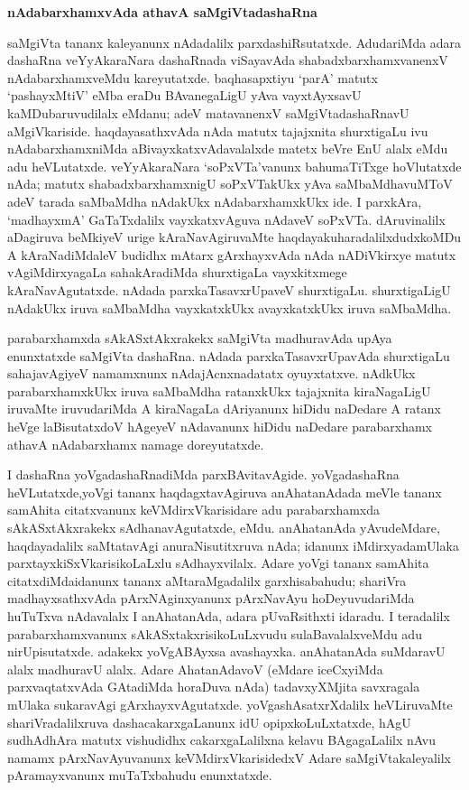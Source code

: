 \newpage

\begin{center}
{\Large\bf nAdabarxhamxvAda athavA saMgiVtadashaRna}
\end{center}

saMgiVta tananx kaleyanunx nAdadalilx parxdashiRsutatxde. AdudariMda adara dashaRna veYyAkaraNara dashaRnada viSayavAda shabadxbarxhamxvanenxV nAdabarxhamxveMdu kareyutatxde. baqhasapxtiyu `parA' matutx `pashayxMtiV' eMba eraDu BAvanegaLigU yAva vayxtAyxsavU kaMDubaruvudilalx eMdanu; adeV matavanenxV saMgiVtadashaRnavU aMgiVkariside. haqdayasathxvAda nAda matutx tajajxnita shurxtigaLu ivu nAdabarxhamxniMda aBivayxkatxvAdavalalxde matetx beVre EnU alalx eMdu adu heVLutatxde. veYyAkaraNara `soPxVTa'vanunx bahumaTiTxge hoVlutatxde nAda; matutx shabadxbarxhamxnigU soPxVTakUkx yAva saMbaMdhavuMToV adeV tarada saMbaMdha nAdakUkx nAdabarxhamxkUkx ide. I parxkAra, `madhayxmA' GaTaTxdalilx vayxkatxvAguva nAdaveV soPxVTa. dAruvinalilx aDagiruva beMkiyeV urige kAraNavAgiruvaMte haqdayakuharadalilxdudxkoMDu A kAraNadiMdaleV budidhx mAtarx gArxhayxvAda nAda nADiVkirxye matutx vAgiMdirxyagaLa sahakAradiMda shurxtigaLa vayxkitxmege kAraNavAgutatxde. nAdada parxkaTasavxrUpaveV shurxtigaLu. shurxtigaLigU nAdakUkx iruva saMbaMdha vayxkatxkUkx avayxkatxkUkx iruva saMbaMdha.

parabarxhamxda sAkASxtAkxrakekx saMgiVta madhuravAda upAya enunxtatxde saMgiVta dashaRna. nAdada parxkaTasavxrUpavAda shurxtigaLu sahajavAgiyeV namamxnunx nAdajAcnxnadatatx oyuyxtatxve. nAdkUkx parabarxhamxkUkx iruva saMbaMdha ratanxkUkx tajajxnita kiraNagaLigU iruvaMte iruvudariMda A kiraNagaLa dAriyanunx hiDidu naDedare A ratanx heVge laBisutatxdoV hAgeyeV nAdavanunx hiDidu naDedare parabarxhamx athavA nAdabarxhamx namage doreyutatxde.

I dashaRna yoVgadashaRnadiMda parxBAvitavAgide. yoVgadashaRna heVLutatxde,\break yoVgi tananx haqdagxtavAgiruva anAhatanAdada meVle tananx samAhita citatxvanunx keVMdirxV\-karisidare adu parabarxhamxda sAkASxtAkxrakekx sAdhanavAgutatxde, eMdu. anAhatanAda yAvu\break\-deMdare, haqdayadalilx saMtatavAgi anuraNisutitxruva nAda; idanunx iMdirxyada\break mUlaka parxtayxkiSxVkarisikoLaLxlu sAdhayxvilalx. Adare yoVgi tananx samAhita citatxdiMda\break idanunx tananx aMtaraMgadalilx garxhisabahudu; shariVra madhayxsathxvAda pArxNAginxyanunx pArxNa\-vAyu hoDeyuvudariMda huTuTxva nAdavalalx I anAhatanAda, adara pUvaR\-sithxti idaradu. I teradalilx parabarxhamxvanunx sAkASxtakxrisikoLuLxvudu sulaBavalalxveMdu adu nirUpisutatxde. adakekx yoVgABAyxsa avashayxka. anAhatanAda suMdaravU alalx madhu\break\-ravU alalx. Adare AhatanAdavoV (eMdare iceCxyiMda parxvaqtatxvAda GAtadiMda hora\-Duva nAda) tadavxyXMjita savxragala mUlaka sukaravAgi gArxhayxvAgutatxde. yoVga\-shAsatxrX\-dalilx heVLiruvaMte shariVradalilxruva dashacakarxgaLanunx idU opipxkoLuLxtatxde, hAgU sudhA\-dhAra matutx vishudidhx cakarxgaLalilxna kelavu BAgagaLalilx nAvu namamx pArxNavAyuvanunx keVMdirxVkari\-sidedxV Adare saMgiVtakaleyalilx pAramayxvanunx muTaTxbahudu enunxtatxde.

